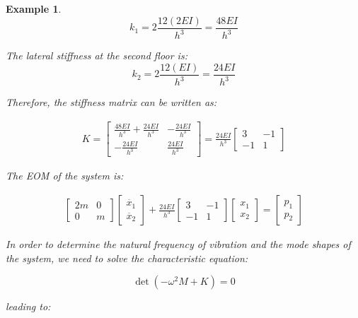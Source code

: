 \documentclass[12pt,letter]{article}
\newtheorem{ex}{Example}
\numberwithin{ex}{section} %
\newenvironment{example}{\begin{mdframed}[middlelinewidth=0.5mm]\begin{ex}\normalfont}{\end{ex}\end{mdframed}}
\numberwithin{re}{section} %
\numberwithin{vcs}{section} %
\begin{document}
\begin{example}
\begin{equation}
k_1 = 2 \frac{12(2EI)}{h^3} = \frac{48EI}{h^3}
\end{equation}

\noindent The lateral stiffness at the second floor is:
\begin{equation}
k_2 = 2 \frac{12(EI)}{h^3} = \frac{24EI}{h^3}
\end{equation}

\noindent Therefore, the stiffness matrix can be written as:

\begin{eqnarray}
K= \begin{bmatrix} \frac{48EI}{h^3} + \frac{24EI}{h^3} & -\frac{24EI}{h^3}  \\  -\frac{24EI}{h^3} & \frac{24EI}{h^3} \end{bmatrix} = \frac{24EI}{h^3} \begin{bmatrix} 3 & -1  \\  -1 & 1 \end{bmatrix}
\end{eqnarray}		


The EOM of the system is:

\begin{eqnarray} 
\begin{bmatrix} 2m & 0  \\  0 & m \end{bmatrix}\begin{bmatrix} \ddot{x_1} \\  \ddot{x_2} \end{bmatrix} + \frac{24EI}{h^3} \begin{bmatrix} 3 & -1  \\  -1 & 1 \end{bmatrix}\begin{bmatrix} x_1 \\  x_2 \end{bmatrix}  = \begin{bmatrix} p_1 \\  p_2 \end{bmatrix}
\end{eqnarray}

In order to determine the natural frequency of vibration and the mode shapes of the system, we need to solve the characteristic equation:

\begin{equation}
\det(-\omega^2 M  + K) = 0
\end{equation}

\noindent leading to:


\end{example}
\end{document}
